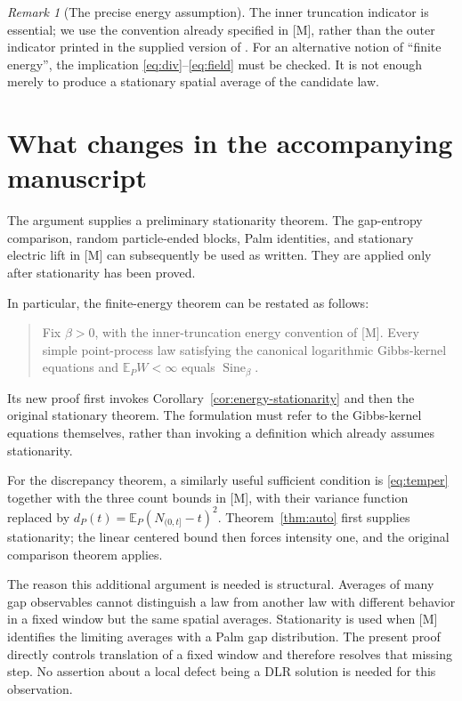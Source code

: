 \documentclass[11pt,reqno]{amsart}
\numberwithin{equation}{section}
\theoremstyle{definition}
\theoremstyle{remark}
\newtheorem{remark}[theorem]{Remark}
\newcommand{\E}{\mathbb E}
\newcommand{\1}{\mathbf1}
\newcommand{\Sine}{\operatorname{Sine}}
\begin{document}
\begin{remark}[The precise energy assumption]
The inner truncation indicator is essential; we use the convention
already specified in [M], rather than the outer indicator printed in
the supplied version of \cite[Definition 2.20]{DHLM}.
For an alternative notion of ``finite energy'', the implication
\eqref{eq:div}--\eqref{eq:field} must be checked. It is not enough
merely to produce a stationary spatial average of the candidate law.
\end{remark}

\section{What changes in the accompanying manuscript}

The argument supplies a preliminary stationarity theorem. The
gap-entropy comparison, random particle-ended blocks, Palm identities,
and stationary electric lift in [M] can subsequently be used as
written. They are applied only after stationarity has been proved.

In particular, the finite-energy theorem can be restated as follows:
\begin{quote}
Fix $\beta>0$, with the inner-truncation energy convention of [M].
Every simple point-process law satisfying the canonical logarithmic
Gibbs-kernel equations and $\E_PW<\infty$ equals $\Sine_\beta$.
\end{quote}
Its new proof first invokes Corollary~\ref{cor:energy-stationarity}
and then the original stationary theorem. The formulation must refer
to the Gibbs-kernel equations themselves, rather than invoking a
definition which already assumes stationarity.

For the discrepancy theorem, a similarly useful sufficient condition
is \eqref{eq:temper} together with the three count bounds in [M],
with their variance function replaced by
$d_P(t)=\E_P(N_{(0,t]}-t)^2$. Theorem~\ref{thm:auto}
first supplies stationarity; the linear centered bound then forces
intensity one, and the original comparison theorem applies.

The reason this additional argument is needed is structural. Averages
of many gap observables cannot distinguish a law from another law
with different behavior in a fixed window but the same spatial
averages. Stationarity is used when [M] identifies the limiting
averages with a Palm gap distribution. The present proof directly
controls translation of a fixed window and therefore resolves that
missing step. No assertion about a local defect being a DLR solution
is needed for this observation.
\end{document}
